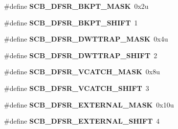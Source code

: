 \begin{DoxyCompactItemize}
\item 
\hypertarget{group___s_c_b___register___masks_gaa21a685119e3829d559a25c8adf5cccb}{}\#define {\bfseries S\+C\+B\+\_\+\+D\+F\+S\+R\+\_\+\+B\+K\+P\+T\+\_\+\+M\+A\+S\+K}~0x2u\label{group___s_c_b___register___masks_gaa21a685119e3829d559a25c8adf5cccb}

\item 
\hypertarget{group___s_c_b___register___masks_gab2da04235aa0df8d6d867336d1b2c9c5}{}\#define {\bfseries S\+C\+B\+\_\+\+D\+F\+S\+R\+\_\+\+B\+K\+P\+T\+\_\+\+S\+H\+I\+F\+T}~1\label{group___s_c_b___register___masks_gab2da04235aa0df8d6d867336d1b2c9c5}

\item 
\hypertarget{group___s_c_b___register___masks_gaa6d8e1428ddb9a650f965c33e09bad7a}{}\#define {\bfseries S\+C\+B\+\_\+\+D\+F\+S\+R\+\_\+\+D\+W\+T\+T\+R\+A\+P\+\_\+\+M\+A\+S\+K}~0x4u\label{group___s_c_b___register___masks_gaa6d8e1428ddb9a650f965c33e09bad7a}

\item 
\hypertarget{group___s_c_b___register___masks_ga6a1d724f4fe22533bd37c3f5179d2219}{}\#define {\bfseries S\+C\+B\+\_\+\+D\+F\+S\+R\+\_\+\+D\+W\+T\+T\+R\+A\+P\+\_\+\+S\+H\+I\+F\+T}~2\label{group___s_c_b___register___masks_ga6a1d724f4fe22533bd37c3f5179d2219}

\item 
\hypertarget{group___s_c_b___register___masks_ga44491a07e0ef59bfe8f7797f03acfabd}{}\#define {\bfseries S\+C\+B\+\_\+\+D\+F\+S\+R\+\_\+\+V\+C\+A\+T\+C\+H\+\_\+\+M\+A\+S\+K}~0x8u\label{group___s_c_b___register___masks_ga44491a07e0ef59bfe8f7797f03acfabd}

\item 
\hypertarget{group___s_c_b___register___masks_gaa503bd566d848235828e742233b8ff20}{}\#define {\bfseries S\+C\+B\+\_\+\+D\+F\+S\+R\+\_\+\+V\+C\+A\+T\+C\+H\+\_\+\+S\+H\+I\+F\+T}~3\label{group___s_c_b___register___masks_gaa503bd566d848235828e742233b8ff20}

\item 
\hypertarget{group___s_c_b___register___masks_ga938e2bfb90d14dba16b2dd249b6cdbdd}{}\#define {\bfseries S\+C\+B\+\_\+\+D\+F\+S\+R\+\_\+\+E\+X\+T\+E\+R\+N\+A\+L\+\_\+\+M\+A\+S\+K}~0x10u\label{group___s_c_b___register___masks_ga938e2bfb90d14dba16b2dd249b6cdbdd}

\item 
\hypertarget{group___s_c_b___register___masks_ga0c4c283537c78ec5650fd7eaaf8c9cd7}{}\#define {\bfseries S\+C\+B\+\_\+\+D\+F\+S\+R\+\_\+\+E\+X\+T\+E\+R\+N\+A\+L\+\_\+\+S\+H\+I\+F\+T}~4\label{group___s_c_b___register___masks_ga0c4c283537c78ec5650fd7eaaf8c9cd7}


\end{DoxyCompactItemize}
